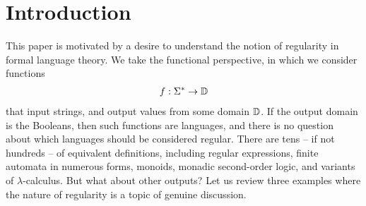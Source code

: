 \section{Introduction}
\label{sec:introduction}
This paper is motivated by a desire to understand the notion of  regularity in formal language theory. We take the functional perspective, in which we consider functions 
\begin{align*}
f : \Sigma^* \to \mathbb D
\end{align*}
that input strings, and output values from some domain $\mathbb D$. 
If the output domain is the Booleans, then such functions
are languages, and there is no question about which languages should be considered regular. There are tens -- if not hundreds -- of equivalent definitions, including regular expressions, finite automata in numerous forms, monoids, monadic second-order logic, and variants of $\lambda$-calculus. But what about other outputs? Let us review three examples where the nature of regularity is a topic of genuine  discussion.

